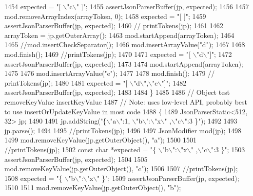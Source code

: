 \begin{DoxyCode}
{{{{{{{{{{{{{{{{{{{{{1454         expected = \textcolor{stringliteral}{"[ \(\backslash\)"c\(\backslash\)" ]"};
1455         assertJsonParserBuffer(jp, expected);
1456 
1457         mod.removeArrayIndex(arrayToken, 0);
1458         expected = \textcolor{stringliteral}{"[  ]"};
1459         assertJsonParserBuffer(jp, expected);
1460         \textcolor{comment}{// printTokens(jp);}
1461 
1462         arrayToken = jp.getOuterArray();
1463         mod.startAppend(arrayToken);
1464 
1465         \textcolor{comment}{//mod.insertCheckSeparator();}
1466         mod.insertArrayValue(\textcolor{stringliteral}{"d"});
1467 
1468         mod.finish();
1469         \textcolor{comment}{//printTokens(jp);}
1470 
1471         expected = \textcolor{stringliteral}{"[  \(\backslash\)"d\(\backslash\)"]"};
1472         assertJsonParserBuffer(jp, expected);
1473 
1474         mod.startAppend(arrayToken);
1475 
1476         mod.insertArrayValue(\textcolor{stringliteral}{"e"});
1477 
1478         mod.finish();
1479         \textcolor{comment}{// printTokens(jp);}
1480 
1481         expected = \textcolor{stringliteral}{"[  \(\backslash\)"d\(\backslash\)",\(\backslash\)"e\(\backslash\)"]"};
1482         assertJsonParserBuffer(jp, expected);
1483 
1484     \}
1485 
1486     \textcolor{comment}{// Object test removeKeyValue insertKeyValue}
1487     \textcolor{comment}{// Note: uses low-level API, probably best to use insertOrUpdateKeyValue in most code}
1488     \{
1489         JsonParserStatic<512, 32> jp;
1490 
1491         jp.addString(\textcolor{stringliteral}{"\{\(\backslash\)"a\(\backslash\)":1, \(\backslash\)"b\(\backslash\)":\(\backslash\)"x\(\backslash\)" ,\(\backslash\)"c\(\backslash\)":3 \}"});
1492 
1493         jp.parse();
1494 
1495         \textcolor{comment}{//printTokens(jp);}
1496 
1497         JsonModifier mod(jp);
1498 
1499         mod.removeKeyValue(jp.getOuterObject(), \textcolor{stringliteral}{"a"});
1500 
1501         \textcolor{comment}{//printTokens(jp);}
1502         \textcolor{keyword}{const} \textcolor{keywordtype}{char} *expected = \textcolor{stringliteral}{"\{ \(\backslash\)"b\(\backslash\)":\(\backslash\)"x\(\backslash\)" ,\(\backslash\)"c\(\backslash\)":3 \}"};
1503         assertJsonParserBuffer(jp, expected);
1504 
1505         mod.removeKeyValue(jp.getOuterObject(), \textcolor{stringliteral}{"c"});
1506 
1507         \textcolor{comment}{//printTokens(jp);}
1508         expected = \textcolor{stringliteral}{"\{ \(\backslash\)"b\(\backslash\)":\(\backslash\)"x\(\backslash\)"  \}"};
1509         assertJsonParserBuffer(jp, expected);
1510 
1511         mod.removeKeyValue(jp.getOuterObject(), \textcolor{stringliteral}{"b"});
}}}}}}}}}}}}}}}}}}}}}
\end{DoxyCode}
